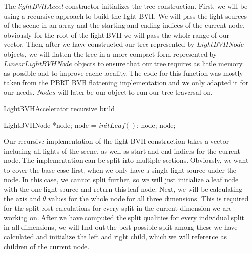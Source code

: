 The $lightBVHAccel$ constructor initializes the tree construction. First, we will be using a recursive approach to build the light BVH. We will pass the light sources of the scene in an array and the starting and ending indices of the current node, obviously for the root of the light BVH we will pass the whole range of our vector. Then, after we have constructed our tree represented by $LightBVHNode$ objects, we will flatten the tree in a more compact form represented by $LinearLightBVHNode$ objects to ensure that our tree requires as little memory as possible and to improve cache locality. The code for this function was mostly taken from the PBRT BVH flattening implementation and we only adapted it for our needs. $Nodes$ will later be our object to run our tree traversal on.

\begin{algorithm}
	\caption{LightBVHAccelerator recursive build}
	\label{recursiveBuild}
	\begin{algorithmic}[1] %
		\State LightBVHNode *node;
			\State *node = $initLeaf()$;
			\State \Return node;
		\EndIf
        	\State <calculate axis and thetas for the whole node for current dimension>
			\State <calculate all split costs for current dimension>
		\EndFor
		\State <find out best split>
		\State <initialize child nodes and make reference as children>
		\State \Return node;
		\EndProcedure
	\end{algorithmic}
\end{algorithm}

Our recursive implementation of the light BVH construction takes a vector including all lights of the scene, as well as start and end indices for the current node. The implementation can be split into multiple sections. Obviously, we want to cover the base case first, when we only have a single light source under the node. In this case, we cannot split further, so we will just initialize a leaf node with the one light source and return this leaf node. Next, we will be calculating the axis and $\theta$ values for the whole node for all three dimensions. This is required for the split cost calculations for every split in the current dimension we are working on. After we have computed the split qualities for every individual split in all dimensions, we will find out the best possible split among these we have calculated and initialize the left and right child, which we will reference as children of the current node.

